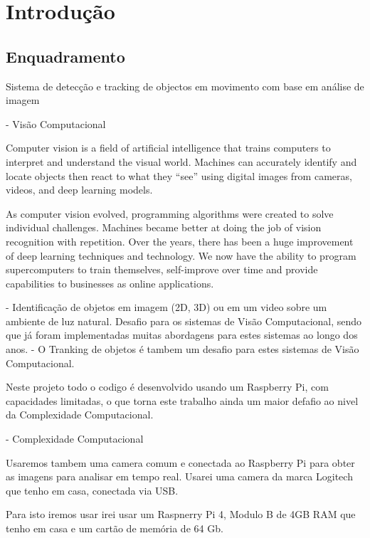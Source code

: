 \chapter{Introdução}
\label{chap:intro}


\section{Enquadramento}
\label{sec:amb}

Sistema de detecção e tracking de objectos em movimento com base em análise de imagem

- Visão Computacional

Computer vision is a field of artificial intelligence that trains computers to interpret and understand the visual world. Machines can accurately identify and locate objects then react to what they “see” using digital images from cameras, videos, and deep learning models.

As computer vision evolved, programming algorithms were created to solve individual challenges. Machines became better at doing the job of vision recognition with repetition. Over the years, there has been a huge improvement of deep learning techniques and technology. We now have the ability to program supercomputers to train themselves, self-improve over time and provide capabilities to businesses as online applications.




- Identificação de objetos em imagem (2D, 3D) ou em um video sobre um ambiente de luz natural.
Desafio para os sistemas de Visão Computacional, sendo que já foram implementadas muitas abordagens para estes sistemas ao longo dos anos.
- O Tranking de objetos é tambem um desafio para estes sistemas de Visão Computacional.

Neste projeto todo o codigo é desenvolvido usando um Raspberry Pi, com capacidades limitadas, o que torna este trabalho ainda um maior defafio ao nivel da Complexidade Computacional.

- Complexidade Computacional 

Usaremos tambem uma camera comum e conectada ao Raspberry Pi para obter as imagens para analisar em tempo real. Usarei uma camera da marca Logitech que tenho em casa, conectada via USB.

Para isto iremos usar irei usar um Raspnerry Pi 4, Modulo B de 4GB RAM que tenho em casa e um cartão de memória de 64 Gb.


